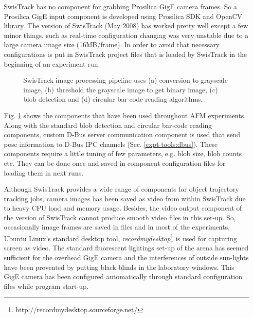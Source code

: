 SwisTrack has no component for grabbing Prosilica GigE camera frames.  So  a Prosilica GigE input component is developed using Prosilica SDK and OpenCV library. The version of SwisTrack (May 2008) has worked pretty well except a few minor things, such as real-time configuration changing was very unstable due to a large camera image size (16MB/frame). In order to avoid that  necessary configurations is put in SwisTrack project files that is loaded by SwisTrack in the beginning of an experiment run.
\begin{figure}[H]
\centering
{} 
\hspace{0.25cm}
\vspace{1cm}
\hspace{0.25cm}
\caption{SwisTrack image processing pipeline uses (a)  conversion to grayscale image, (b) threshold the grayscale image to get binary image, (c) blob detection and (d) circular bar-code reading algorithms.}
\label{fig:swistrack-pipeline}
\end{figure}

Fig. \ref{fig:swistrack-pipeline} shows the components that  have been used throughout AFM experiments. Along with the standard blob detection and circular bar-code reading components,  custom D-Bus server communication component is used that send pose information to D-Bus \acf{IPC} channels (Sec. \ref{expt-tools:dbus}). These components require a little tuning of few parameters, e.g. blob size, blob counts etc. They can be done once and saved in component configuration files for loading them in next runs. 

Although SwisTrack provides a wide range of components for object trajectory tracking jobs, camera images has been saved as video from within SwisTrack due to heavy CPU load and memory usage. Besides, the video output component of the version of SwisTrack cannot produce smooth video files in this set-up. So,  occasionally  image frames are saved in files and in most of the experiments, Ubuntu Linux's standard desktop  tool, {\em recordmydesktop}\footnote{http://recordmydesktop.sourceforge.net/} is used for capturing screen as video. The standard fluorescent lightings set-up of the arena has seemed sufficient for the overhead GigE camera and the interferences of outside sun-lights have been prevented by putting black blinds in the laboratory windows. This GigE camera has been configured automatically through standard configuration files while program start-up.
